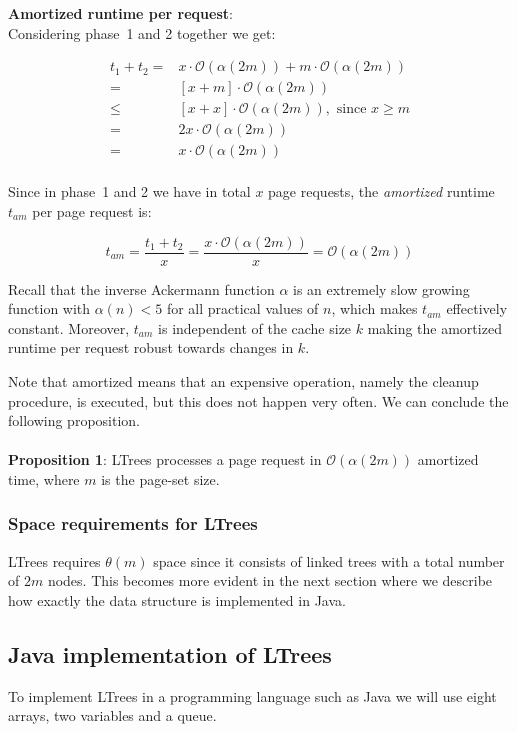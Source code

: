 \documentclass[a4paper,12pt, titlepage]{article}  %
\newcommand{\oh}{\mathcal{O}}   %
\begin{document}
\noindent \textbf{Amortized runtime per request}:\\
Considering phase~1 and 2 together we get:

\begin{align*}   %
t_1 + t_2 = & x \cdot \oh(\alpha(2m)) + m \cdot \oh(\alpha(2m)) \\
=   & [x +m] \cdot \oh(\alpha(2m))  \\
\leq   & [x + x] \cdot \oh(\alpha(2m)), \text{ since } x \geq m  \\
=   & 2x \cdot \oh(\alpha(2m))  \\
=   & x \cdot \oh(\alpha(2m))  \\
\end{align*} %

\noindent Since in phase~1 and 2 we have in total $x$ page requests, the \emph{amortized}
runtime $t_{am}$ per page request is:

\[
t_{am} = \frac{t_1 + t_2}{x} =  \frac{x \cdot \oh(\alpha(2m)) }{x} = \oh(\alpha(2m))
\]

\noindent Recall that the inverse Ackermann function
$\alpha$ is an extremely slow growing function with $\alpha(n) < 5$ for all practical values 
of $n$, which makes $t_{am}$ effectively constant. 
Moreover, $t_{am}$ is independent of the cache size $k$ making the amortized runtime per 
request robust towards changes in $k$. 

Note that amortized means that an expensive operation, namely
the cleanup procedure, is executed, but this does not happen very often. 
We can conclude the following proposition.\\
\\
\noindent \textbf{Proposition 1}: LTrees processes a page request in $\oh(\alpha(2m))$ amortized time, 
where $m$ is the page-set size.

\subsubsection{Space requirements for LTrees}
LTrees requires $\theta(m)$ space since it consists of linked trees with a total number of $2m$ nodes.
This becomes more evident in the next section where we describe how exactly the data structure is 
implemented in Java.


\subsection{Java implementation of LTrees}
To implement LTrees in a programming language such as Java we will use eight arrays, two variables and a queue. \\
\end{document}
